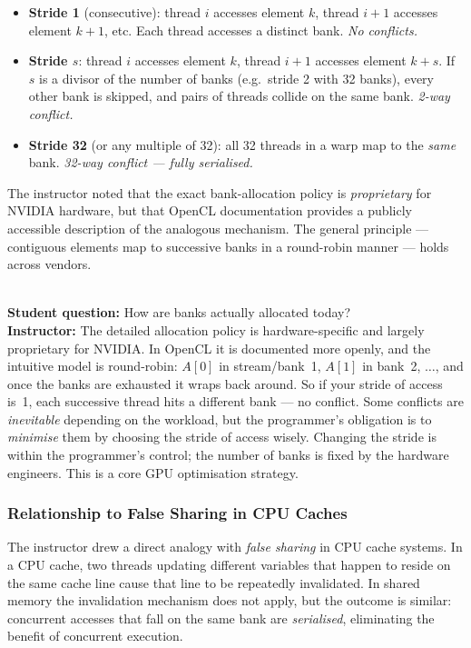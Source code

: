 \begin{itemize}
  \item \textbf{Stride 1} (consecutive): thread $i$ accesses element $k$,
        thread $i+1$ accesses element $k+1$, etc. Each thread accesses a
        distinct bank. \emph{No conflicts.}
  \item \textbf{Stride $s$}: thread $i$ accesses element $k$, thread $i+1$
        accesses element $k + s$. If $s$ is a divisor of the number of banks
        (e.g.\ stride 2 with 32 banks), every other bank is skipped, and
        pairs of threads collide on the same bank. \emph{2-way conflict.}
  \item \textbf{Stride 32} (or any multiple of 32): all 32 threads in a warp
        map to the \emph{same} bank. \emph{32-way conflict --- fully
        serialised.}
\end{itemize}

The instructor noted that the exact bank-allocation policy is
\emph{proprietary} for NVIDIA hardware, but that OpenCL documentation provides
a publicly accessible description of the analogous mechanism. The general
principle --- contiguous elements map to successive banks in a round-robin
manner --- holds across vendors.

\begin{ppnote}
  \\\textbf{Student question:} How are banks actually allocated today?\\[4pt]
  \textbf{Instructor:} The detailed allocation policy is hardware-specific and
  largely proprietary for NVIDIA. In OpenCL it is documented more openly, and
  the intuitive model is round-robin: $A[0]$ in stream/bank~1, $A[1]$ in
  bank~2, $\ldots$, and once the banks are exhausted it wraps back around. So
  if your stride of access is~1, each successive thread hits a different bank
  --- no conflict. Some conflicts are \emph{inevitable} depending on the
  workload, but the programmer's obligation is to \emph{minimise} them by
  choosing the stride of access wisely. Changing the stride is within the
  programmer's control; the number of banks is fixed by the hardware engineers.
  This is a core GPU optimisation strategy.
\end{ppnote}

\subsubsection{Relationship to False Sharing in CPU Caches}

The instructor drew a direct analogy with \emph{false sharing} in CPU cache
systems. In a CPU cache, two threads updating different variables that happen
to reside on the same cache line cause that line to be repeatedly invalidated.
In shared memory the invalidation mechanism does not apply, but the outcome is
similar: concurrent accesses that fall on the same bank are \emph{serialised},
eliminating the benefit of concurrent execution.


